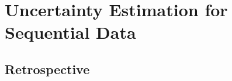 \chapter{Uncertainty Estimation for Sequential Data}
\label{chap:sequential_data}







\section*{Retrospective}
%
